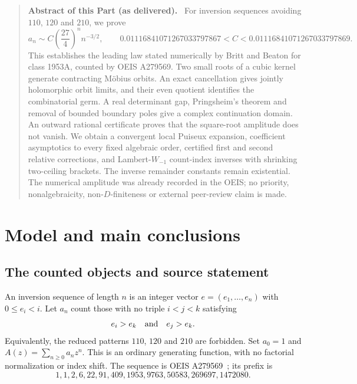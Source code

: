 \documentclass[11pt,letterpaper]{article}
\theoremstyle{remark}\newtheorem{remark}[theorem]{Remark}
\newenvironment{partabstract}{\begin{quote}\small\noindent\textbf{Abstract of this Part (as delivered).}\ }{\end{quote}}
\begin{document}
\begin{partabstract}
For inversion sequences avoiding $110$, $120$ and $210$, we prove
\[
 a_n\sim C\left(\frac{27}{4}\right)^n n^{-3/2},\qquad
 0.01116841071267033797867<C<0.01116841071267033797869.
\]
This establishes the leading law stated numerically by Britt and Beaton
for class 1953A, counted by OEIS A279569. Two small roots of a cubic
kernel generate contracting M\"obius orbits. An exact cancellation gives
jointly holomorphic orbit limits, and their even quotient identifies the
combinatorial germ. A real determinant gap, Pringsheim's theorem and
removal of bounded boundary poles give a complex continuation domain.
An outward rational certificate proves that the square-root amplitude
does not vanish. We obtain a convergent local Puiseux expansion,
coefficient asymptotics to every fixed algebraic order, certified first
and second relative corrections, and Lambert-$W_{-1}$ count-index inverses with shrinking two-ceiling brackets.
The inverse remainder constants remain existential. The numerical
amplitude was already recorded in the OEIS; no priority, nonalgebraicity,
non-$D$-finiteness or external peer-review claim is made.
\end{partabstract}

\section{Model and main conclusions}
\subsection{The counted objects and source statement}
An inversion sequence of length $n$ is an integer vector
$e=(e_1,\ldots,e_n)$ with $0\le e_i<i$. Let $a_n$ count those with no
triple $i<j<k$ satisfying
\begin{equation}\label{ivk:two:avoid}
 e_i>e_k\quad\hbox{and}\quad e_j>e_k.
\end{equation}
Equivalently, the reduced patterns $110$, $120$ and $210$ are forbidden.
Set $a_0=1$ and $A(z)=\sum_{n\ge0}a_nz^n$. This is an ordinary generating
function, with no factorial normalization or index shift. The sequence
is OEIS A279569~\cite{oeis1953}; its prefix is
\[
1,1,2,6,22,91,409,1953,9763,50583,269697,1472080.
\]
\end{document}
